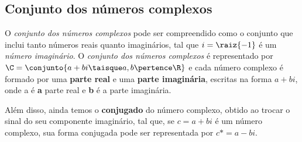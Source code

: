\subsection{Conjunto dos números complexos}

O \emph{conjunto dos números complexos} pode ser compreendido como o conjunto que inclui tanto números reais quanto imaginários, tal que $i = \raiz{-1}$ é um \emph{número imaginário}. O \emph{conjunto dos números complexos} é representado por  $\C = \conjunto{ a+bi \taisque a,b \pertence \R}$ e cada número complexo é formado por uma \textbf{parte real} e uma \textbf{parte imaginária}, escritas na forma $a + bi$, onde a é \textbf{a} parte real e \textbf{b} é a parte imaginária. 

Além disso, ainda temos o \textbf{conjugado} do número complexo, obtido ao trocar o sinal do seu componente imaginário, tal que, se $c = a + bi$ é um número complexo, sua forma conjugada pode ser representada por $c* = a - bi$.